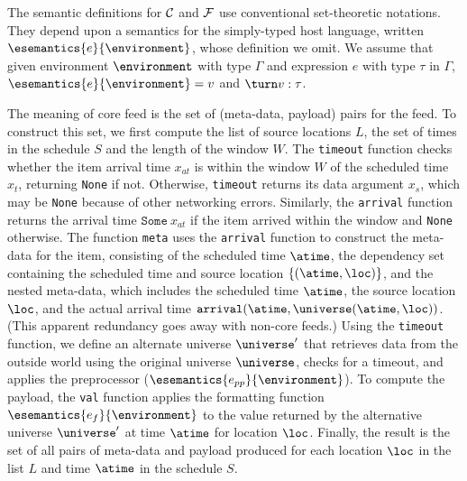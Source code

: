 The semantic definitions for ${\cal C}$ and ${\cal F}$ use
conventional set-theoretic notations.  They depend upon a
semantics for the simply-typed host language, written
$\esemantics{e}{\environment}$, whose definition we omit. We assume
that given environment $\environment$ with type $\Gamma$ and
expression $e$ with type $\tau$ in $\Gamma$,
$\esemantics{e}{\environment} = v$ and $\turn v : \tau$.

The meaning of core feed \corefeed{} is the set of
(meta-data, payload) pairs for the feed.  To construct this set, we
first compute the list of source locations $L$,
the set of times in the schedule $S$ and the 
length of the window $W$.
The \texttt{timeout} function checks whether the item arrival time
$x_{at}$ is within the window $W$
of the scheduled time $x_t$, returning \texttt{None} if
not. Otherwise, \texttt{timeout} returns its data argument $x_s$,
which may be {\tt None} because of other networking errors.  
Similarly, the \texttt{arrival} function returns the arrival time
$\texttt{Some}\ x_{at}$ if the item arrived within the window and 
\texttt{None} otherwise. The function \texttt{meta} uses the 
\texttt{arrival} function to construct the meta-data for the item,
consisting of the scheduled time $\atime$, the dependency set containing the scheduled
time and  source location $\{(\atime, \loc)\}$, and the nested
meta-data, which includes the scheduled 
time $\atime$, the source location $\loc$, and the actual arrival time
$\texttt{arrival}(\atime,\universe(\atime,\loc))$. (This apparent
redundancy goes away with non-core feeds.) 
Using the
\texttt{timeout} function, we define an alternate universe
$\universe'$ that retrieves data from the outside world using the
original universe $\universe$, checks for a
timeout, and applies the preprocessor
($\esemantics{e_{pp}}{\environment}$).  
To compute the payload, the \texttt{val} function applies the formatting function 
$\esemantics{e_{f}}{\environment}$ to the value 
returned by the alternative universe $\universe'$ 
at time $\atime$ for location $\loc$.
Finally, the result is the set of all pairs of meta-data and payload
produced for each location $\loc$ in the list $L$ and time $\atime$ in
the schedule $S$.

